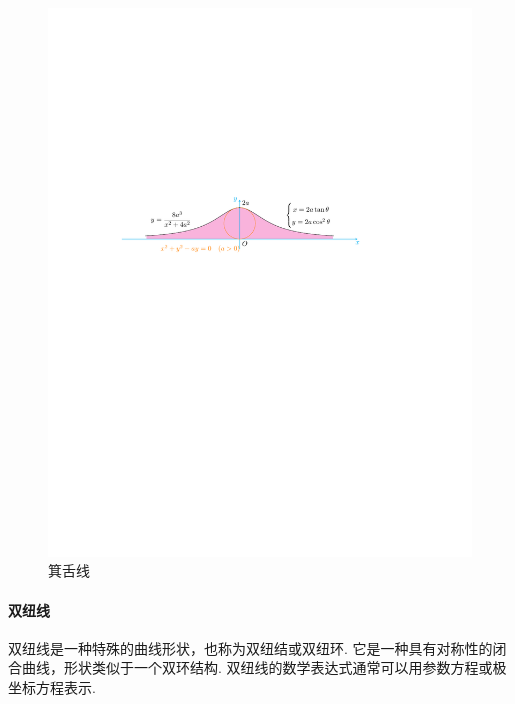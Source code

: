 \begin{figure}[H]
    \centering
    \includegraphics{figures/MiTongueLine.pdf}
    \caption{箕舌线}
    \label{miTongueLine}
\end{figure}

\paragraph{双纽线}

双纽线是一种特殊的曲线形状，也称为双纽结或双纽环. 它是一种具有对称性的闭合曲线，形状类似于一个双环结构. 双纽线的数学表达式通常可以用参数方程或极坐标方程表示. 

